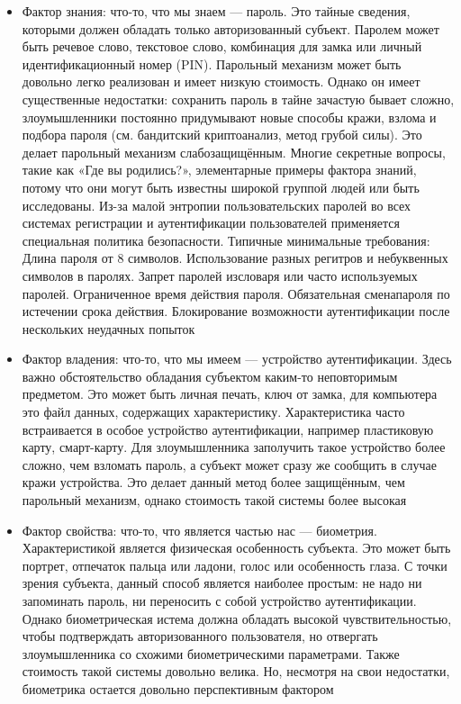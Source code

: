 \begin{itemize}
    \item Фактор знания: что-то, что мы знаем — пароль. Это тайные сведения, которыми должен
        обладать только авторизованный субъект. Паролем может быть речевое слово, текстовое слово,
        комбинация для замка или личный идентификационный номер (PIN). Парольный механизм может
        быть довольно легко реализован и имеет низкую стоимость. Однако он имеет существенные
        недостатки: сохранить пароль в тайне зачастую бывает сложно, злоумышленники постоянно
        придумывают новые способы кражи, взлома и подбора пароля (см. бандитский криптоанализ,
        метод грубой силы). Это делает парольный механизм слабозащищённым. Многие секретные
        вопросы, такие как «Где вы родились?», элементарные примеры фактора знаний, потому что они
        могут быть известны широкой группой людей или быть исследованы. Из-за малой энтропии
        пользовательских паролей во всех системах регистрации и аутентификации пользователей
        применяется специальная политика безопасности. Типичные минимальные требования: Длина
        пароля от 8 символов. Использование разных регитров и небуквенных символов в паролях.
        Запрет паролей изсловаря или часто используемых паролей. Ограниченное время действия
        пароля. Обязательная сменапароля по истечении срока действия. Блокирование возможности
        аутентификации после нескольких неудачных попыток
    \item Фактор владения: что-то, что мы имеем — устройство аутентификации. Здесь важно
        обстоятельство обладания субъектом каким-то неповторимым предметом. Это может быть личная
        печать, ключ от замка, для компьютера это файл данных, содержащих характеристику.
        Характеристика часто встраивается в особое устройство аутентификации, например пластиковую
        карту, смарт-карту. Для злоумышленника заполучить такое устройство более сложно, чем взломать
        пароль, а субъект может сразу же сообщить в случае кражи устройства. Это делает данный метод
        более защищённым, чем парольный механизм, однако стоимость такой системы более высокая
    \item Фактор свойства: что-то, что является частью нас — биометрия. Характеристикой является
        физическая особенность субъекта. Это может быть портрет, отпечаток пальца или ладони, голос или
        особенность глаза. С точки зрения субъекта, данный способ является наиболее простым: не надо ни
        запоминать пароль, ни переносить с собой устройство аутентификации. Однако биометрическая
        истема должна обладать высокой чувствительностью, чтобы подтверждать авторизованного
        пользователя, но отвергать злоумышленника со схожими биометрическими параметрами. Также
        стоимость такой системы довольно велика. Но, несмотря на свои недостатки, биометрика
        остается довольно перспективным фактором
\end{itemize}


